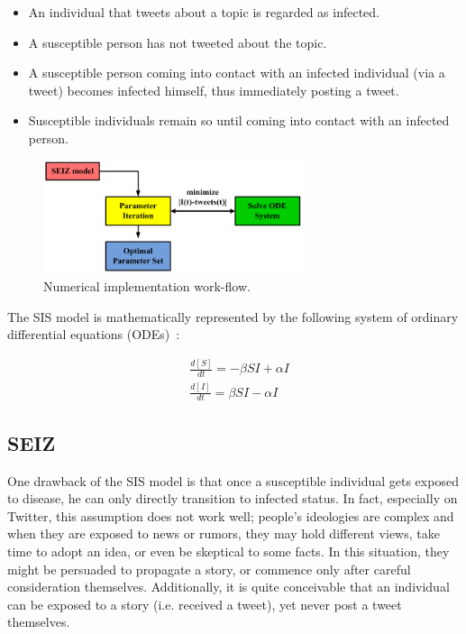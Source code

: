 \begin{itemize}
\item An individual that tweets about a topic is regarded as infected.
\item A susceptible person has not tweeted about the topic.
\item A susceptible person coming into contact with an infected individual (via a tweet) becomes infected himself, thus immediately posting a tweet.
\item Susceptible individuals remain so until coming into contact with an infected person.
\end{itemize}

\begin{figure}[h]
\centering
  \includegraphics[width=3in]{pictures/implementation_flow.png}
  \caption{Numerical implementation work-flow.
  }
  \label{fig:implementation_flow}
\end{figure}

\noindent
The SIS model is mathematically represented by the following system of ordinary differential equations (ODEs)~\cite{murray2002mathematical}:

\begin{subequations}\label{eq:sis}
\begin{align}
&\frac{d [S]}{dt} = -\beta S I + \alpha I \\
&\frac{d [I]}{dt} = \beta S I - \alpha I
\end{align}
\end{subequations}


\subsection{SEIZ}
One drawback of the SIS model is that once a susceptible individual gets exposed to disease, he can only directly transition to infected status. In fact, especially on Twitter, this assumption does not work well; people's ideologies are complex and when they are exposed to news or rumors, they may hold different views, take time to adopt an idea, or even be skeptical to some facts. In this situation, they might be persuaded to propagate a story, or commence only after careful consideration themselves. Additionally, it is quite conceivable that an individual can be exposed to a story (i.e. received a tweet), yet never post a tweet themselves.

